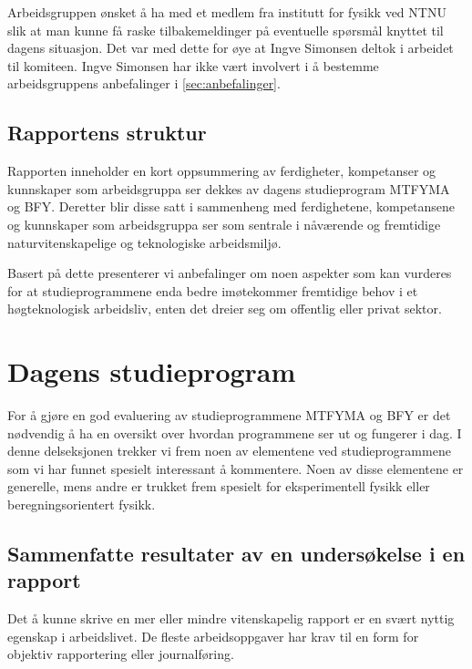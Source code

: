 \documentclass{article}
\begin{document}
Arbeidsgruppen ønsket å ha med et medlem fra institutt for fysikk ved NTNU slik at man kunne få raske tilbakemeldinger på eventuelle spørsmål knyttet til dagens situasjon. Det var med dette for øye at Ingve Simonsen deltok i arbeidet til komiteen. Ingve Simonsen har ikke vært involvert i å bestemme arbeidsgruppens anbefalinger i \cref{sec:anbefalinger}.

\subsection{Rapportens struktur}
Rapporten inneholder en kort oppsummering av ferdigheter, kompetanser og kunnskaper som arbeidsgruppa ser dekkes av dagens studieprogram MTFYMA og BFY. Deretter blir disse satt i sammenheng med ferdighetene, kompetansene og kunnskaper som arbeidsgruppa ser som sentrale i nåværende og fremtidige naturvitenskapelige og teknologiske arbeidsmiljø.

Basert på dette presenterer vi anbefalinger om noen aspekter som kan vurderes for at studieprogrammene enda bedre imøtekommer fremtidige behov i et høgteknologisk arbeidsliv, enten det dreier seg om offentlig eller privat sektor.

\clearpage
\section{Dagens studieprogram}
\label{Sammenlikning}
For å gjøre en god evaluering av studieprogrammene MTFYMA og BFY er det nødvendig å ha en oversikt over hvordan programmene ser ut og fungerer i dag. I denne delseksjonen trekker vi frem noen av elementene ved studieprogrammene som vi har funnet spesielt interessant å kommentere. Noen av disse elementene er generelle, mens andre er trukket frem spesielt for eksperimentell fysikk eller beregningsorientert fysikk.

\subsection{Sammenfatte resultater av en undersøkelse i en rapport}
\label{Rapport}
Det å kunne skrive en mer eller mindre vitenskapelig rapport er en svært nyttig egenskap i arbeidslivet. De fleste arbeidsoppgaver har krav til en form for objektiv rapportering eller journalføring.
\end{document}

